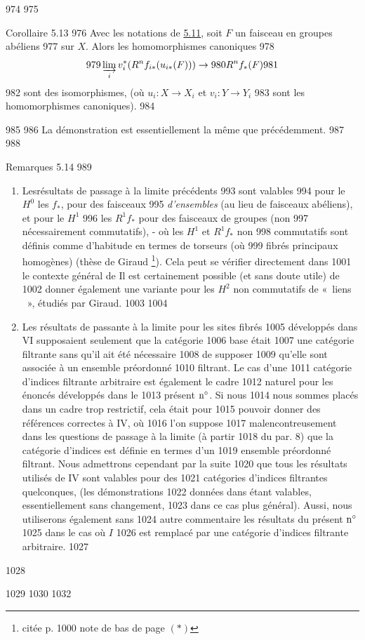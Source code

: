    974	
   975	\begin{enonce*}{Corollaire 5.13}
   976	Avec les notations de \hyperref[VII.cor5.11]{5.11}, soit $F$ un faisceau en groupes abéliens
   977	sur $X$. Alors les homomorphismes canoniques
   978	$$
   979	\varinjlim_i v_i^{\ast} (R^n f_{i\ast} (u_{i\ast} (F))) \to
   980	R^n f_{\ast} (F)
   981	$$
   982	sont des isomorphismes, (où $u_i : X \to X_i$ et $v_i : Y \to Y_i$
   983	sont les homomorphismes canoniques).
   984	\end{enonce*}
   985	
   986	La démonstration est essentiellement la même que précédemment.
   987	
   988	\begin{enonce*}[remark]{Remarques 5.14}
   989	\begin{enumerate}
   990	\renewcommand{\theenumi}{\alph{enumi}}
   991	\renewcommand{\labelenumi}{\theenumi)}
   992	\item Les\pageoriginale résultats de passage à la limite précédents
   993	  sont valables
   994	pour le $H^{0}$ \resp les $f_{\ast}$, pour des faisceaux
   995	\emph{d'ensembles} (au lieu de faisceaux abéliens), et pour le $H^{1}$
   996	\resp les $R^1 f_{\ast}$ pour des faisceaux de groupes (non
   997	nécessairement commutatifs), - où les $H^1$ et $R^1 f_{\ast}$ non
   998	commutatifs sont définis comme d'habitude en termes de torseurs (où
   999	fibrés principaux homogènes) (\cf thèse de Giraud \footnote{citée p.
  1000	note de bas de page $(\ast)$}). Cela peut se vérifier directement dans
  1001	le contexte général de Il est certainement possible (et sans doute utile) de
  1002	donner également une variante pour les $H^2$ non commutatifs de « liens  », étudiés par Giraud.
  1003	
  1004	\item Les résultats de passante à la limite pour les sites fibrés
  1005	développés dans VI supposaient seulement que la catégorie
  1006	base était
  1007	une catégorie filtrante sans qu'il ait été nécessaire
  1008	de supposer
  1009	qu'elle sont associée à un ensemble préordonné
  1010	filtrant. Le cas d'une
  1011	catégorie d'indices filtrante arbitraire est également le cadre
  1012	naturel pour les énoncés développés dans le
  1013	présent ${\rm n^{\circ}}$. Si nous
  1014	nous sommes placés dans un cadre trop restrictif, cela était pour
  1015	pouvoir donner des références correctes à \EGA IV, où
  1016	l'on suppose
  1017	malencontreusement dans les questions de passage à la limite (à partir
  1018	du par. 8) que la catégorie d'indices est définie en termes d'un
  1019	ensemble préordonné filtrant. Nous admettrons cependant par la suite
  1020	que tous les résultats utilisés de \EGA IV sont valables pour des
  1021	catégories d'indices filtrantes quelconques, (les démonstrations
  1022	données dans \loccit étant valables, essentiellement sans changement,
  1023	dans ce cas plus général). Aussi, nous utiliserons également sans
  1024	autre commentaire les résultats du présent ${\rm n^{\circ}}$
  1025	dans le cas où $I$
  1026	est remplacé par une catégorie d'indices filtrante arbitraire.
  1027	\end{enumerate}
  1028	\end{enonce*}
  1029	
  1030	\ifx\danslelivre{}	
  1032	\fi
